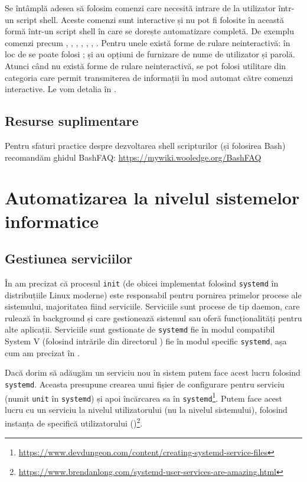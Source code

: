 Se întâmplă adesea să folosim comenzi care necesită intrare de la utilizator într-un script shell.
Aceste comenzi sunt interactive și nu pot fi folosite în această formă într-un script shell în care se dorește automatizare completă.
De exemplu comenzi precum , , , , , , .
Pentru unele există forme de rulare neinteractivă: în loc de  se poate folosi ;  și  au opțiuni de furnizare de nume de utilizator și parolă.
Atunci când nu există forme de rulare neinteractivă, se pot folosi utilitare din categoria  care permit transmiterea de informații în mod automat către comenzi interactive.
Le vom detalia în .

\subsection{Resurse suplimentare}
\label{sec:auto:script-advanced:resources}

Pentru sfaturi practice despre dezvoltarea shell scripturilor (și folosirea Bash) recomandăm ghidul BashFAQ: \url{https://mywiki.wooledge.org/BashFAQ}

\section{Automatizarea la nivelul sistemelor informatice}
\label{sec:auto:system}

\subsection{Gestiunea serviciilor}
\label{sec:auto:system:service}

În  am precizat că procesul \texttt{init} (de obicei implementat folosind \texttt{systemd} în distribuțiile Linux moderne) este responsabil pentru pornirea primelor procese ale sistemului, majoritatea fiind serviciile.
Serviciile sunt procese de tip daemon, care rulează în background și care gestionează sistemul sau oferă funcționalități pentru alte aplicații.
Serviciile sunt gestionate de \texttt{systemd} fie în modul compatibil System V (folosind intrările din directorul ) fie în modul specific \texttt{systemd}, așa cum am precizat în .

Dacă dorim să adăugăm un serviciu nou în sistem putem face acest lucru folosind \texttt{systemd}.
Aceasta presupune crearea unui fișier de configurare pentru serviciu (numit \texttt{unit} în \texttt{systemd}) și apoi încărcarea sa în \texttt{systemd}\footnote{\url{https://www.devdungeon.com/content/creating-systemd-service-files}}.
Putem face acest lucru cu un serviciu la nivelul utilizatorului (nu la nivelul sistemului), folosind instanța de  specifică utilizatorului ()\footnote{\url{https://www.brendanlong.com/systemd-user-services-are-amazing.html}}.

